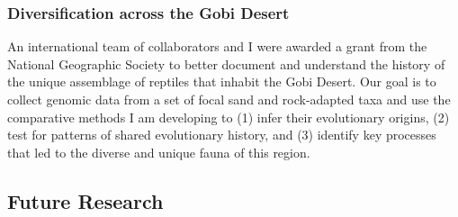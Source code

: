 \subsubsection*{Diversification across the Gobi Desert}
An international team of collaborators
and I were awarded a
grant from the National Geographic Society to better document and understand
the history of the unique assemblage of reptiles that inhabit the Gobi Desert.
Our goal is to collect genomic data from a set of focal sand and rock-adapted
taxa and use the comparative methods I am developing to
(1) infer their evolutionary origins,
(2) test for patterns of shared evolutionary history, and
(3) identify key processes that led to the diverse and unique fauna of this
region.



\subsection*{Future Research}


